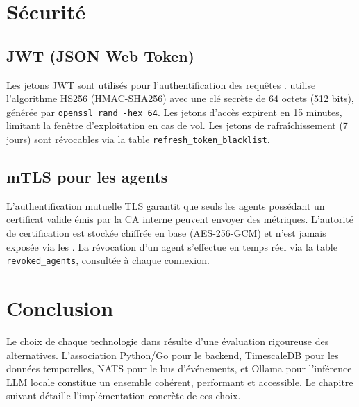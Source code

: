\section{Sécurité}

\subsection{JWT (JSON Web Token)}

Les jetons JWT \cite{rfc7519} sont utilisés pour l'authentification des requêtes
\api{}. \caimp{} utilise l'algorithme HS256 (HMAC-SHA256) avec une clé secrète
de 64 octets (512 bits), générée par \texttt{openssl rand -hex 64}. Les jetons
d'accès expirent en 15 minutes, limitant la fenêtre d'exploitation en cas
de vol. Les jetons de rafraîchissement (7 jours) sont révocables via la table
\texttt{refresh\_token\_blacklist}.

\subsection{mTLS pour les agents}

L'authentification mutuelle TLS \cite{rfc8446} garantit que seuls les agents
possédant un certificat valide émis par la CA interne peuvent envoyer des métriques.
L'autorité de certification est stockée chiffrée en base (AES-256-GCM) et
n'est jamais exposée via les \api{}. La révocation d'un agent s'effectue en
temps réel via la table \texttt{revoked\_agents}, consultée à chaque connexion.

\section*{Conclusion}

Le choix de chaque technologie dans \caimp{} résulte d'une évaluation rigoureuse
des alternatives. L'association Python/Go pour le backend, TimescaleDB pour les
données temporelles, NATS pour le bus d'événements, et Ollama pour l'inférence
LLM locale constitue un ensemble cohérent, performant et accessible. Le chapitre
suivant détaille l'implémentation concrète de ces choix.
